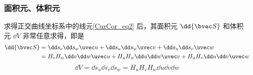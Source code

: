 \subsubsection{面积元、体积元}
求得正交曲线坐标系中的线元\autoref{CurCor_eq2} 后，其面积元 $\dd {\bvec S}$ 和体积元 $\dd V$ 非常任意求得，即是
\begin{equation}\label{CurCor_eq4}
\begin{aligned}
\dd {\bvec S}&=\dd s_v\dd s _w \uvec u+\dd s_u\dd s _w \uvec v+\dd s_u\dd s _v \uvec w\\
&=H_vH_w\dd v\dd w\uvec u+H_uH_w\dd u\dd w\uvec v+H_uH_v\dd u\dd v\uvec w
\end{aligned}
\end{equation}
\begin{equation}
\dd V=\dd s_u\dd s_v\dd s_w=H_uH_vH_w\dd u\dd v\dd w
\end{equation}


